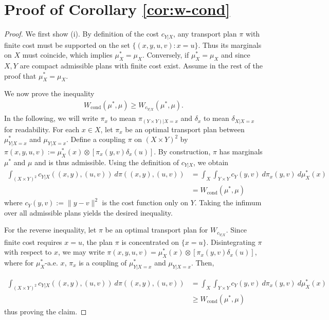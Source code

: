 \documentclass{article}
\theoremstyle{definition}
\theoremstyle{remarksty}
\begin{document}
\section{Proof of Corollary \ref{cor:w-cond}}\label{supp:w-cond}
\label{sec:app-cond-wass}
\begin{proof}
    We first show (i). By definition of the cost $c_{Y|X}$, any transport plan $\pi$ with finite cost must be supported on the set $\{(x,y,u,v) : x = u\}$. Thus its marginals on $X$ must coincide, which implies $\mu_X^* = \mu_X$. Conversely, if $\mu_X^* = \mu_X$ and since $X,Y$ are compact admissible plans with finite cost exist.
    Assume in the rest of the proof that $\mu_X^* = \mu_X$.  

    We now prove the inequality 
    \begin{align*}
         W_\text{cond}(\mu^*, \mu) \geq W_{c_{Y|X}}(\mu^*, \mu).
    \end{align*}
    In the following, we will write  $\pi_x$ to mean $\pi_{(Y\times Y)|X=x}$ and $\delta_x$ to mean $\delta_{X|X=x}$  for readability. For each $x \in X$, let $\pi_x$ be an optimal transport plan between $\mu_{Y|X=x}^*$ and $\mu_{Y|X=x}$. Define a coupling $\pi$ on $(X\times Y)^2$ by $\pi(x,y,u,v):=\mu_X^*(x)\otimes [\pi_x(y, v)\delta_x(u)]$. By construction, $\pi$ has marginals $\mu^*$ and $ \mu$ and is thus admissible. Using the definition of $c_{Y|X}$, we obtain
    \begin{align*}
        \int_{(X\times Y)^2} c_{Y|X}((x,y),(u,v))\ d\pi((x,y),(u,v)) &= \int_X \int_{Y \times Y} c_Y(y,v)\ d\pi_x(y,v)\ d\mu_X^*(x) \\
        &= W_\text{cond}(\mu^*, \mu)
    \end{align*}
    where $c_Y(y,v):= \|y-v\|^2$ is the cost function only on $Y$. Taking the infimum over all admissible plans yields the desired inequality.  

    For the reverse inequality, let $\pi$ be an optimal transport plan for $W_{c_{Y|X}}$. Since finite cost requires $x=u$, the plan $\pi$ is concentrated on $\{x=u\}$. Disintegrating $\pi$ with respect to $x$, we may write $\pi(x,y,u,v) =  \mu_X^*(x)\otimes[\pi_x(y,v)\delta_x(u)]$, where for $\mu_X^*$-a.e. $x$, $\pi_x$ is a coupling of $\mu^*_{Y|X=x}$ and $\mu_{Y|X=x}$. Then,

    \begin{align*}
        \int_{(X\times Y)^2} c_{Y|X}((x,y),(u,v))\ d\pi((x,y),(u,v)) &= \int_X \int_{Y \times Y} c_Y(y,v)\ d\pi_x(y,v)\ d\mu_X^*(x) \\
        &\geq W_\text{cond}(\mu^*, \mu)
    \end{align*}
    thus proving the claim.



\end{proof}
\end{document}
